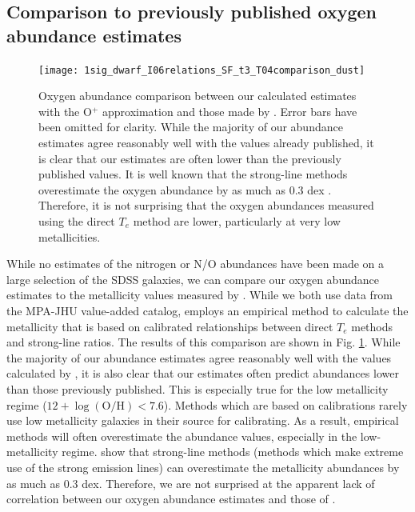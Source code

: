 \subsection{Comparison to previously published oxygen abundance estimates}

\begin{figure}
    \centering
    \texttt{[image: 1sig\_dwarf\_I06relations\_SF\_t3\_T04comparison\_dust]}
    \caption{Oxygen abundance comparison between our calculated estimates with 
    the O$^+$ approximation and those made by \cite{Tremonti04}.  Error bars 
    have been omitted for clarity.  While the majority of our abundance 
    estimates agree reasonably well with the values already published, it is 
    clear that our estimates are often lower than the previously published 
    values.  It is well known that the strong-line methods \citep[like those 
    used by][]{Tremonti04} overestimate the oxygen abundance by as much as 0.3 
    dex \citep{Kennicutt03}.  Therefore, it is not surprising that the oxygen 
    abundances measured using the direct $T_e$ method are lower, particularly at 
    very low metallicities.}
    \label{fig:T04_comp}
\end{figure}

While no estimates of the nitrogen or N/O abundances have been made on a large 
selection of the SDSS galaxies, we can compare our oxygen abundance estimates to 
the metallicity values measured by \cite{Tremonti04}.  While we both use data 
from the MPA-JHU value-added catalog, \cite{Tremonti04} employs an empirical 
method to calculate the metallicity that is based on calibrated relationships 
between direct $T_e$ methods and strong-line ratios.  The results of this 
comparison are shown in Fig. \ref{fig:T04_comp}.  While the majority of our 
abundance estimates agree reasonably well with the values calculated by 
\cite{Tremonti04}, it is also clear that our estimates often predict abundances 
lower than those previously published.  This is especially true for the low 
metallicity regime ($12 + \log \left(\text{O}/\text{H}\right) < 7.6$).  Methods 
which are based on calibrations rarely use low metallicity galaxies in their 
source for calibrating.  As a result, empirical methods will often overestimate 
the abundance values, especially in the low-metallicity regime.  
\cite{Kennicutt03} show that strong-line methods (methods which make extreme use 
of the strong emission lines) can overestimate the metallicity abundances by as 
much as 0.3 dex.  Therefore, we are not surprised at the apparent lack of 
correlation between our oxygen abundance estimates and those of 
\cite{Tremonti04}.


